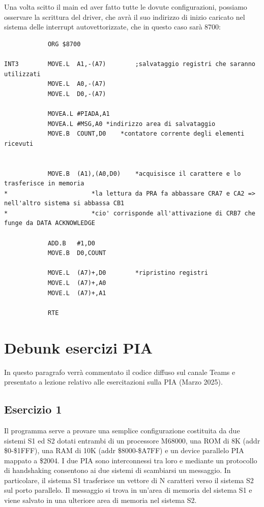 Una volta scitto il main ed aver fatto tutte le dovute configurazioni, possiamo osservare la scrittura del driver, che avrà il suo indirizzo di inizio caricato nel sistema delle interrupt autovettorizzate, che in questo caso sarà 8700:
\begin{lstlisting}
            ORG $8700		

INT3        MOVE.L  A1,-(A7)		;salvataggio registri che saranno utilizzati
            MOVE.L  A0,-(A7)
            MOVE.L  D0,-(A7)

            MOVEA.L	#PIADA,A1
            MOVEA.L	#MSG,A0	*indirizzo area di salvataggio              
            MOVE.B	COUNT,D0	*contatore corrente degli elementi ricevuti

    
            MOVE.B 	(A1),(A0,D0)	*acquisisce il carattere e lo trasferisce in memoria
*						*la lettura da PRA fa abbassare CRA7 e CA2 => nell'altro sistema si abbassa CB1
*						*cio' corrisponde all'attivazione di CRB7 che funge da DATA ACKNOWLEDGE
    
            ADD.B	#1,D0
            MOVE.B	D0,COUNT

            MOVE.L  (A7)+,D0		*ripristino registri 
            MOVE.L  (A7)+,A0
            MOVE.L  (A7)+,A1
            
            RTE
\end{lstlisting}


\section{Debunk esercizi PIA}
In questo paragrafo verrà commentato il codice diffuso sul canale Teams e presentato a lezione relativo alle esercitazioni sulla PIA (Marzo 2025).

\subsection{Esercizio 1} \label{par:es_1_1}
Il programma serve a provare una semplice configurazione costituita da due sistemi S1 ed S2 dotati entrambi di un processore M68000, una ROM di 8K (addr \$0-\$1FFF), una RAM di 10K (addr \$8000-\$A7FF) e un device parallelo PIA mappato a \$2004.
I due PIA sono interconnessi tra loro e mediante un protocollo di handshaking consentono ai due sistemi di scambiarsi un messaggio. In particolare, il sistema S1 trasferisce un vettore di N caratteri verso il sistema S2 sul porto parallelo. Il messaggio si trova in un'area di memoria del sistema S1 e viene salvato in una ulteriore area di memoria nel sistema S2.

